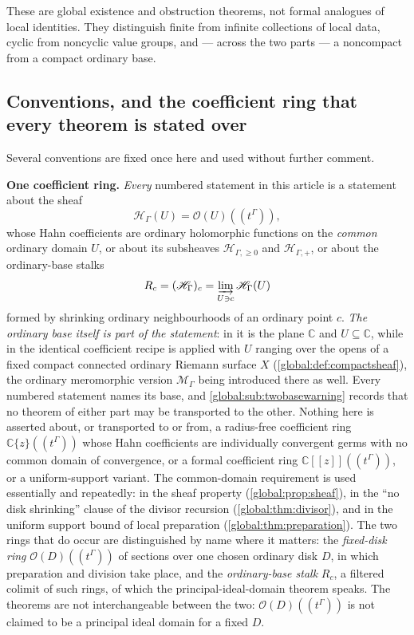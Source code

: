 \documentclass[11pt,letterpaper]{article}
\theoremstyle{definition}
\theoremstyle{remark}
\newcommand{\C}{\mathbb C}
\newcommand{\OO}{\mathcal O}
\newcommand{\HH}{\mathscr H_\Gamma}
\newcommand{\HP}{\mathscr H_{\Gamma,+}}
\newcommand{\HI}{\mathscr H_{\Gamma,\ge0}}
\newcommand{\MG}{\mathscr M_\Gamma}
\numberwithin{equation}{section}
\begin{document}
These are global existence and obstruction theorems, not formal analogues of local identities. They distinguish finite from infinite collections of local data, cyclic from noncyclic value groups, and --- across the two parts --- a noncompact from a compact ordinary base.

\subsection{Conventions, and the coefficient ring that every theorem is stated over}\label{global:sub:conventions}

Several conventions are fixed once here and used without further comment.

\smallskip
\noindent\textbf{One coefficient ring.} \emph{Every} numbered statement in this article is a statement about the sheaf
\[
  \HH(U)=\OO(U)((t^\Gamma)),
\]
whose Hahn coefficients are ordinary holomorphic functions on the \emph{common} ordinary domain $U$, or about its subsheaves $\HI$ and $\HP$, or about the ordinary-base stalks
\[
  R_c=(\HH)_c=\varinjlim_{U\ni c}\HH(U)
\]
formed by shrinking ordinary neighbourhoods of an ordinary point $c$. \emph{The ordinary base itself is part of the statement}: in  it is the plane $\C$ and $U\subseteq\C$, while in  the identical coefficient recipe is applied with $U$ ranging over the opens of a fixed compact connected ordinary Riemann surface $X$ (\cref{global:def:compactsheaf}), the ordinary meromorphic version $\MG$ being introduced there as well. Every numbered statement names its base, and \cref{global:sub:twobasewarning} records that no theorem of either part may be transported to the other. Nothing here is asserted about, or transported to or from, a radius-free coefficient ring $\C\{z\}((t^\Gamma))$ whose Hahn coefficients are individually convergent germs with no common domain of convergence, or a formal coefficient ring $\C[[z]]((t^\Gamma))$, or a uniform-support variant. The common-domain requirement is used essentially and repeatedly: in the sheaf property (\cref{global:prop:sheaf}), in the ``no disk shrinking'' clause of the divisor recursion (\cref{global:thm:divisor}), and in the uniform support bound of local preparation (\cref{global:thm:preparation}). The two rings that do occur are distinguished by name where it matters: the \emph{fixed-disk ring} $\OO(D)((t^\Gamma))$ of sections over one chosen ordinary disk $D$, in which preparation and division take place, and the \emph{ordinary-base stalk} $R_c$, a filtered colimit of such rings, of which the principal-ideal-domain theorem speaks. The theorems are not interchangeable between the two: $\OO(D)((t^\Gamma))$ is not claimed to be a principal ideal domain for a fixed $D$.
\end{document}

